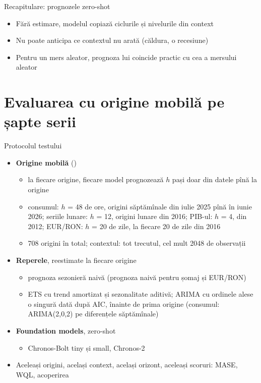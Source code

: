 \begin{frame}{Recapitulare: prognozele zero-shot}
\itemsize{\small}
\begin{itemize}
    \item Fără estimare, modelul copiază ciclurile și nivelurile din context
    \item Nu poate anticipa ce contextul nu arată (căldura, o recesiune)
    \item Pentru un mers aleator, prognoza lui coincide practic cu cea a mersului aleator
\end{itemize}
\end{frame}


\section{Evaluarea cu origine mobilă pe șapte serii}

\begin{frame}{Protocolul testului}
\itemsize{\footnotesize}
\begin{itemize}
    \item \textbf{Origine mobilă} ()
    \begin{itemize}
        \item la fiecare origine, fiecare model prognozează $h$ pași doar din datele pînă la origine
        \item consumul: $h$ = 48 de ore, origini săptămînale din iulie 2025 pînă în iunie 2026; seriile lunare: $h$ = 12, origini lunare din 2016; PIB-ul: $h$ = 4, din 2012; EUR/RON: $h$ = 20 de zile, la fiecare 20 de zile din 2016
        \item 708 origini în total; contextul: tot trecutul, cel mult 2048 de observații
    \end{itemize}
    \item \textbf{Reperele}, reestimate la fiecare origine
    \begin{itemize}
        \item prognoza sezonieră naivă (prognoza naivă pentru șomaj și EUR/RON)
        \item ETS cu trend amortizat și sezonalitate aditivă; ARIMA cu ordinele alese o singură dată după AIC, înainte de prima origine (consumul: ARIMA(2,0,2) pe diferențele săptămînale)
    \end{itemize}
    \item \textbf{Foundation models}, zero-shot
    \begin{itemize}
        \item Chronos-Bolt tiny și small, Chronos-2
    \end{itemize}
    \item Aceleași origini, același context, același orizont, aceleași scoruri: MASE, WQL, acoperirea
\end{itemize}
\end{frame}

